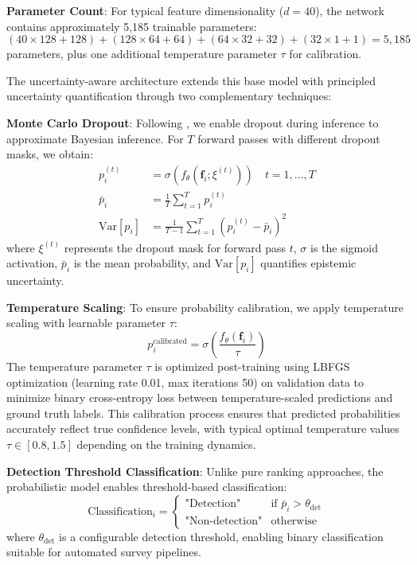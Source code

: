 \documentclass[twocolumn,10pt]{aastex631}
\begin{document}
\textbf{Parameter Count}: For typical feature dimensionality ($d = 40$), the network contains approximately 5,185 trainable parameters: $(40 \times 128 + 128) + (128 \times 64 + 64) + (64 \times 32 + 32) + (32 \times 1 + 1) = 5,185$ parameters, plus one additional temperature parameter $\tau$ for calibration.

The uncertainty-aware architecture extends this base model with principled uncertainty quantification through two complementary techniques:

\textbf{Monte Carlo Dropout}: Following \citet{Gal2016MCDropout}, we enable dropout during inference to approximate Bayesian inference. For $T$ forward passes with different dropout masks, we obtain:
\begin{align}
p_i^{(t)} &= \sigma(f_{\theta}(\mathbf{f}_i; \xi^{(t)})) \quad t = 1, \ldots, T \\
\bar{p}_i &= \frac{1}{T} \sum_{t=1}^T p_i^{(t)} \\
\text{Var}[p_i] &= \frac{1}{T-1} \sum_{t=1}^T (p_i^{(t)} - \bar{p}_i)^2
\end{align}
where $\xi^{(t)}$ represents the dropout mask for forward pass $t$, $\sigma$ is the sigmoid activation, $\bar{p}_i$ is the mean probability, and $\text{Var}[p_i]$ quantifies epistemic uncertainty.

\textbf{Temperature Scaling}: To ensure probability calibration, we apply temperature scaling \citep{Laves2019WellCalibratedMU} with learnable parameter $\tau$:
\begin{equation}
p_i^{\text{calibrated}} = \sigma\left(\frac{f_{\theta}(\mathbf{f}_i)}{\tau}\right)
\end{equation}
The temperature parameter $\tau$ is optimized post-training using LBFGS optimization (learning rate 0.01, max iterations 50) on validation data to minimize binary cross-entropy loss between temperature-scaled predictions and ground truth labels. This calibration process ensures that predicted probabilities accurately reflect true confidence levels, with typical optimal temperature values $\tau \in [0.8, 1.5]$ depending on the training dynamics.

\textbf{Detection Threshold Classification}: Unlike pure ranking approaches, the probabilistic model enables threshold-based classification:
\begin{equation}
\text{Classification}_i = \begin{cases}
\text{"Detection"} & \text{if } \bar{p}_i > \theta_{\text{det}} \\
\text{"Non-detection"} & \text{otherwise}
\end{cases}
\end{equation}
where $\theta_{\text{det}}$ is a configurable detection threshold, enabling binary classification suitable for automated survey pipelines.
\end{document}
